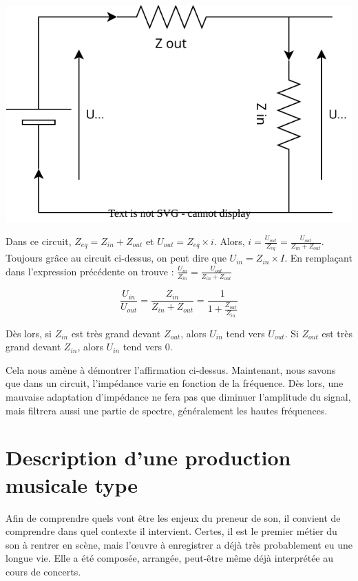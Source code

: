 \documentclass[
]{book}
\begin{document}
\begin{center}\includegraphics{_resources/diagrams/impedance} \end{center}

Dans ce circuit, \(Z_{eq} = Z_{in} + Z_{out}\) et \(U_{out} = Z_{eq} \times i\). Alors, \(i = \frac{U_{out}}{Z_{eq}} = \frac{U_{out}}{Z_{in} + Z_{out}}\). Toujours grâce au circuit ci-dessus, on peut dire que \(U_{in} = Z_{in} \times I\). En remplaçant dans l'expression précédente on trouve : \(\frac{U_{in}}{Z_{in}} = \frac{U_{out}}{Z_{in} + Z_{out}}\)

\[ \frac{U_{in}}{U_{out}} = \frac{Z_{in}}{Z_{in} + Z_{out}} = \frac{1}{1+\frac{Z_{out}}{Z_{in}}} \]

Dès lors, si \(Z_{in}\) est très grand devant \(Z_{out}\), alors \(U_{in}\) tend vers \(U_{out}\). Si \(Z_{out}\) est très grand devant \(Z_{in}\), alors \(U_{in}\) tend vers \(0\).

Cela nous amène à démontrer l'affirmation ci-dessus. Maintenant, nous savons que dans un circuit, l'impédance varie en fonction de la fréquence. Dès lors, une mauvaise adaptation d'impédance ne fera pas que diminuer l'amplitude du signal, mais filtrera aussi une partie de spectre, généralement les hautes fréquences.

\hypertarget{description-dune-production-musicale-type}{%
\chapter{Description d'une production musicale type}\label{description-dune-production-musicale-type}}

Afin de comprendre quels vont être les enjeux du preneur de son, il convient de comprendre dans quel contexte il intervient. Certes, il est le premier métier du son à rentrer en scène, mais l'œuvre à enregistrer a déjà très probablement eu une longue vie. Elle a été composée, arrangée, peut-être même déjà interprétée au cours de concerts.
\end{document}
